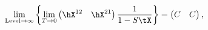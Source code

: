 \begin{equation} %
  \lim_{\text{Level} \to \infty}\left\{
  \lim_{T\to 0} 
  \left(
    \begin{matrix}
      \hX^{12} & \hX^{21}
    \end{matrix}
  \right)
  \frac{1}{1-S \tX}\right\}
  =
  \left( 
    \begin{matrix}
       C & C
    \end{matrix}
   \right),
\end{equation} 
